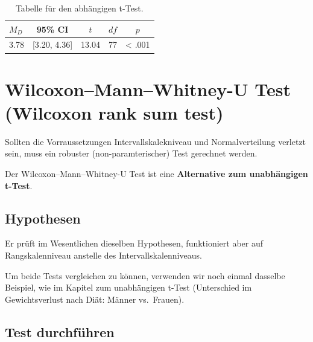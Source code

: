 \documentclass[
]{book}
\begin{document}
\begin{table}[tbp]

\begin{center}
\begin{threeparttable}

\caption{\label{tab:unnamed-chunk-262}Tabelle für den abhängigen t-Test.}

\begin{tabular}{lllll}
\toprule
$M_D$ & \multicolumn{1}{c}{95\% CI} & \multicolumn{1}{c}{$t$} & \multicolumn{1}{c}{$\mathit{df}$} & \multicolumn{1}{c}{$p$}\\
\midrule
3.78 & {}[3.20, 4.36] & 13.04 & 77 & < .001\\
\bottomrule
\end{tabular}

\end{threeparttable}
\end{center}

\end{table}

\section{Wilcoxon--Mann--Whitney-U Test (Wilcoxon rank sum test)}\label{wilcoxonmannwhitney-u-test-wilcoxon-rank-sum-test}

Sollten die Vorraussetzungen Intervallskalekniveau und Normalverteilung verletzt sein, muss ein robuster (non-paramterischer) Test gerechnet werden.

Der Wilcoxon--Mann--Whitney-U Test ist eine \textbf{Alternative zum unabhängigen t-Test}.

\subsection{Hypothesen}\label{hypothesen-4}

Er prüft im Wesentlichen dieselben Hypothesen, funktioniert aber auf Rangskalenniveau anstelle des Intervallskalenniveaus.

Um beide Tests vergleichen zu können, verwenden wir noch einmal dasselbe Beispiel, wie im Kapitel zum unabhängigen t-Test (Unterschied im Gewichtsverlust nach Diät: Männer vs.~Frauen).

\subsection{Test durchführen}\label{test-durchfuxfchren-3}
\end{document}
